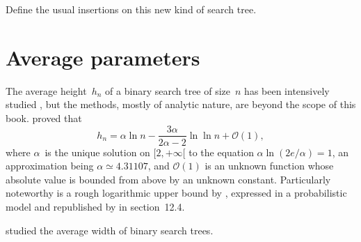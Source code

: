 Define the usual insertions on this new kind of search tree.



\section{Average parameters}

The average height~\(h_n\) of a binary search tree of size~\(n\) has
been intensively studied \citep{Devroye_1986, Devroye_1987,
  Mahmoud_1992, KnesslSpankowski_2002}, but the methods, mostly of
analytic nature, are beyond the scope of this book. \cite{Reed_2003}
proved that
\begin{equation*}
h_n = \alpha \ln n - \frac{3\alpha}{2\alpha - 2} \ln\ln n + \mathcal{O}(1),
\end{equation*}
where \(\alpha\)~is the unique solution on \([2,+\infty[\) to the
equation \(\alpha\ln(2e/\alpha) = 1\), an approximation being \(\alpha
\simeq 4.31107\), and \(\mathcal{O}(1)\) is an unknown function whose
absolute value is bounded from above by an unknown
constant. Particularly noteworthy is a rough logarithmic upper bound
by \cite{Aslam_2001}, expressed in a probabilistic model and
republished by \cite{CLRS_2009} in section~12.4.

\cite{ChauvinDrmotaJabbour-Hattab_2001} studied the average width of
binary search trees.

